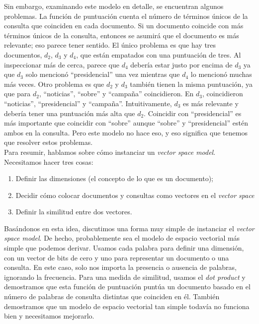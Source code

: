 Sin embargo, examinando este modelo en detalle, se encuentran algunos problemas. La función de puntuación cuenta el número de términos únicos de la consulta que coinciden en cada documento. Si un documento coincide con más términos únicos de la consulta, entonces se asumirá que el documento es más relevante; eso parece tener sentido. El único problema es que hay tres documentos, $d_2$, $d_3$ y $d_4$, que están empatados con una puntuación de tres. Al inspeccionar más de cerca, parece que $d_4$ debería estar justo por encima de $d_3$ ya que $d_3$ solo mencionó ``presidencial'' una vez mientras que $d_4$ lo mencionó muchas más veces. Otro problema es que $d_2$ y $d_3$ también tienen la misma puntuación, ya que para $d_2$, ``noticias'', ``sobre'' y ``campaña'' coincidieron. En $d_3$, coincidieron ``noticias'', ``presidencial'' y ``campaña''. Intuitivamente, $d_3$ es más relevante y debería tener una puntuación más alta que $d_2$. Coincidir con ``presidencial'' es más importante que coincidir con ``sobre'' aunque ``sobre'' y ``presidencial'' estén ambos en la consulta. Pero este modelo no hace eso, y eso significa que tenemos que resolver estos problemas. \\

Para resumir, hablamos sobre cómo instanciar un \textit{vector space model}. Necesitamos hacer tres cosas:
\begin{enumerate}
\item Definir las dimensiones (el concepto de lo que es un documento);
\item Decidir cómo colocar documentos y consultas como vectores en el \textit{vector space}
\item Definir la similitud entre dos vectores.
\end{enumerate}

Basándonos en esta idea, discutimos una forma muy simple de instanciar el \textit{vector space model}. De hecho, probablemente sea el modelo de espacio vectorial más simple que podemos derivar. Usamos cada palabra para definir una dimensión, con un vector de bits de cero y uno para representar un documento o una consulta. En este caso, solo nos importa la presencia o ausencia de palabras, ignorando la frecuencia. Para una medida de similitud, usamos el \textit{dot product} y demostramos que esta función de puntuación puntúa un documento basado en el número de palabras de consulta distintas que coinciden en él. También demostramos que un modelo de espacio vectorial tan simple todavía no funciona bien y necesitamos mejorarlo.

